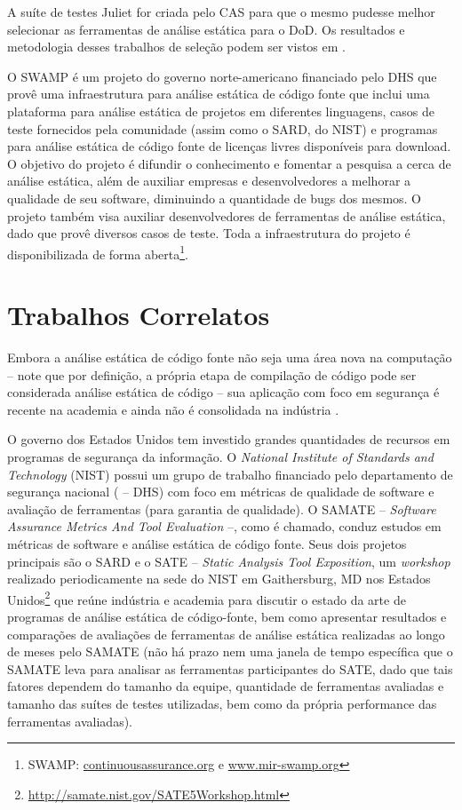   A suíte de testes Juliet for criada pelo CAS para que o mesmo pudesse melhor selecionar as ferramentas de análise estática para o DoD. Os resultados e metodologia desses trabalhos de seleção podem ser vistos em \cite{nsa}.

  O SWAMP é um projeto do governo norte-americano financiado pelo DHS que provê uma infraestrutura para análise estática de código fonte que inclui uma plataforma para análise estática de projetos em diferentes linguagens, casos de teste fornecidos pela comunidade (assim como o SARD, do NIST) e programas para análise estática de código fonte de licenças livres disponíveis para download. O objetivo do projeto é difundir o conhecimento e fomentar a pesquisa a cerca de análise estática, além de auxiliar empresas e desenvolvedores a melhorar a qualidade de seu software, diminuindo a quantidade de bugs dos mesmos. O projeto também visa auxiliar desenvolvedores de ferramentas de análise estática, dado que provê diversos casos de teste. Toda a infraestrutura do projeto é disponibilizada de forma aberta\footnote{SWAMP: \url{continuousassurance.org} e \url{www.mir-swamp.org}}.                   

  \section{Trabalhos Correlatos}

  Embora a análise estática de código fonte não seja uma  área nova na computação – note que por definição, a própria etapa de compilação de código pode ser considerada análise estática de código – sua aplicação com foco em segurança é recente na academia e ainda não é consolidada na indústria \cite{johnson2013don}.

  O governo dos Estados Unidos tem investido grandes quantidades de recursos em programas de segurança da informação. O \textit{National Institute of Standards and Technology} (NIST) possui um grupo de trabalho financiado pelo departamento de segurança nacional ( – DHS) com foco em métricas de qualidade de software e avaliação de ferramentas (para garantia de qualidade). O SAMATE – \textit{Software Assurance Metrics And Tool Evaluation} –, como é chamado, conduz estudos em métricas de software e análise estática de código fonte. Seus dois projetos principais são o SARD e o SATE – \textit{Static Analysis Tool Exposition}, um \textit{workshop} realizado periodicamente na sede do NIST em Gaithersburg, MD nos Estados Unidos\footnote{\url{http://samate.nist.gov/SATE5Workshop.html}} que reúne indústria e academia para discutir o estado da arte de programas de análise estática de código-fonte, bem como apresentar resultados e comparações de avaliações de ferramentas de análise estática realizadas ao longo de meses pelo SAMATE (não há prazo nem uma janela de tempo específica que o SAMATE leva para analisar as ferramentas participantes do SATE, dado que tais fatores dependem do tamanho da equipe, quantidade de ferramentas avaliadas e tamanho das suítes de testes utilizadas, bem como da própria performance das ferramentas avaliadas).

